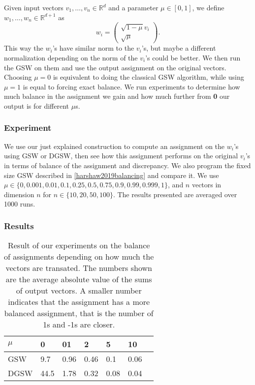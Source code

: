 \documentclass[12pt]{article}
\begin{document}
Given input vectors $v_1,\dots,v_n\in\mathbb{R}^d$ and a parameter $\mu\in[0,1]$, we define $w_1,\dots,w_n\in\mathbb{R}^{d+1}$ as $$w_i=\begin{pmatrix}\sqrt{1-\mu}v_i \\ \sqrt{\mu}\end{pmatrix}.$$ This way the $w_i$'s have similar norm to the $v_i$'s, but maybe a different normalization depending on the norm of the $v_i$'s could be better. We then run the GSW on them and use the output assignment on the original vectors. Choosing $\mu=0$ is equivalent to doing the classical GSW algorithm, while using $\mu=1$ is equal to forcing exact balance. We run experiments to determine how much balance in the assignment we gain and how much further from \textbf{0} our output is for different $\mu$s.

\subsubsection{Experiment}
We use our just explained construction to compute an assignment on the $w_i$'s using GSW or DGSW, then see how this assignment performs on the original $v_i$'s in terms of balance of the assignment and discrepancy. We also program the fixed size GSW described in \ref{harshaw2019balancing} and compare it. We use $\mu\in\{0,0.001,0.01,0.1,0.25,0.5,0.75,0.9,0.99,0.999,1\}$, and $n$ vectors in dimension $n$ for $n\in\{10,20,50,100\}$. The results presented are averaged over 1000 runs.

\subsubsection{Results}

\begin{center}
\begin{table}[h]
\begin{tabular}{l|llllll}
 $\mu$ & 0 & 01  & 2 & 5 & 10  \\
\hline
GSW  & 9.7 & 0.96 & 0.46 & 0.1 & 0.06 \\
DGSW & 44.5 & 1.78 & 0.32 & 0.08 & 0.04
\end{tabular}
\caption{Result of our experiments on the balance of assignments depending on how much the vectors are transated. The numbers shown are the average absolute value of the sums of output vectors. A smaller number indicates that the assignment has a more balanced assignment, that is the number of 1s and -1s are closer.}
\label{balance_when_translated}
\end{table}
\end{center}
\end{document}
